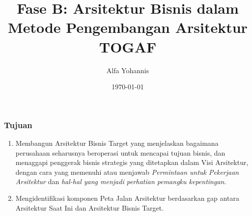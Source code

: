 \documentclass[aspectratio=169]{beamer}
\title{Fase B: Arsitektur Bisnis dalam Metode Pengembangan Arsitektur TOGAF}
\author{Alfa Yohannis}
\date{\today}
\begin{document}
	
	\frame{\titlepage}
	
	\begin{frame}
		\frametitle{Tujuan}
		\begin{enumerate}
			\item Membangun Arsitektur Bisnis Target yang menjelaskan bagaimana perusahaan seharusnya beroperasi untuk mencapai tujuan bisnis, dan menaggapi penggerak bisnis strategis yang ditetapkan dalam Visi Arsitektur, dengan cara yang memenuhi atau menjawab \textit{Permintaan untuk Pekerjaan Arsitektur} dan \textit{hal-hal yang menjadi perhatian pemangku kepentingan}.
			
			\item Mengidentifikasi komponen Peta Jalan Arsitektur berdasarkan gap antara Arsitektur Saat Ini dan Arsitektur Bisnis Target.
		\end{enumerate}
	\end{frame}
	
\end{document}
